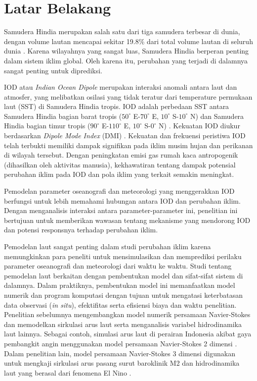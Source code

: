 \vspace{1.5pc}
\section[Latar Belakang]{Latar Belakang}
\begin{spacing}{1.5}
	Samudera Hindia merupakan salah satu dari tiga samudera terbesar di dunia, dengan volume lautan mencapai sekitar 19.8\% dari total volume lautan di seluruh dunia \cite{Eakins2010}. Karena wilayahnya yang sangat luas, Samudera Hindia berperan penting dalam sistem iklim global. Oleh karena itu, perubahan yang terjadi di dalamnya sangat penting untuk diprediksi.
	
	IOD atau \textit{Indian Ocean Dipole} merupakan interaksi anomali antara laut dan atmosfer, yang melibatkan osilasi yang tidak teratur dari temperature permukaan laut (SST) di Samudera Hindia tropis. IOD adalah perbedaan SST antara Samudera Hindia bagian barat tropis ($50^\circ$ E-$70^\circ$ E, $10^\circ$ S-$10^\circ$ N) dan Samudera Hindia bagian timur tropis ($90^\circ$ E-$110^\circ$ E, $10^\circ$ S-$0^\circ$ N) \cite{Shunmugapandi2022,Thushara2020,Sattar2019}. Kekuatan IOD diukur berdasarkan \textit{Dipole Mode Index} (DMI) \cite{Saji1999}. Kekuatan dan frekuensi peristiwa IOD telah terbukti memiliki dampak signifikan pada iklim musim hujan \cite{Qiu2014} dan perikanan \cite{Lan2013} di wilayah tersebut. Dengan peningkatan emisi gas rumah kaca antropogenik (dihasilkan oleh aktivitas manusia), kekhawatiran tentang dampak potensial perubahan iklim pada IOD dan pola iklim yang terkait semakin meningkat.
	
	Pemodelan parameter oseanografi dan meteorologi yang menggerakkan IOD berfungsi untuk lebih memahami hubungan antara IOD dan perubahan iklim. Dengan menganalisis interaksi antara parameter-parameter ini, penelitian ini bertujuan untuk memberikan wawasan tentang mekanisme yang mendorong IOD dan potensi responsnya terhadap perubahan iklim.
	
	Pemodelan laut sangat penting dalam studi perubahan iklim karena memungkinkan para peneliti untuk mensimulasikan dan memprediksi perilaku parameter oseanografi dan meteorologi dari waktu ke waktu. Studi tentang pemodelan laut berkaitan dengan pembentukan model dan sifat-sifat sistem di dalamnya. Dalam praktiknya, pembentukan model ini memanfaatkan model numerik dan program komputasi dengan tujuan untuk mengatasi keterbatasan data observasi (\textit{in situ}), efektifitas serta efisiensi biaya dan waktu penelitian. Penelitian sebelumnya mengembangkan model numerik persamaan Navier-Stokes dan memodelkan sirkulasi arus laut serta menganalisis variabel hidrodinamika laut lainnya. Sebagai contoh, simulasi arus laut di perairan Indonesia akibat gaya pembangkit angin menggunakan model persamaan Navier-Stokes 2 dimensi \cite{Rizal2018,Ikhwan2019,Haditiar2019}. Dalam penelitian lain, model persamaan Navier-Stokes 3 dimensi digunakan untuk mengkaji sirkulasi arus pasang surut baroklinik M2 dan hidrodinamika laut yang berasal dari fenomena El Nino \cite{Rizal2010,Haditiar2020,Ikhwan2021}.
	

\end{spacing}
